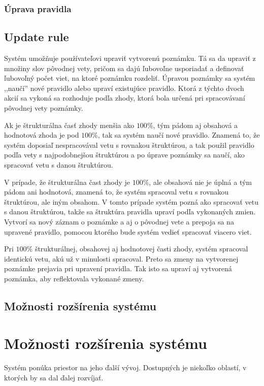 %
%
{
	\subsubsection{Úprava pravidla}
}
{
	\subsection{Update rule}
}
\label{subsubsection:rule_update}
Systém umožňuje používateľovi upraviť vytvorenú poznámku. Tá sa da upraviť z množiny slov pôvodnej vety, pričom sa dajú ľubovoľne usporiadať a definovať ľubovoľný počet viet, na ktoré poznámku rozdeliť. Úpravou poznámky sa systém ,,naučí'' nové pravidlo alebo upraví existujúce pravidlo. Ktorá z týchto dvoch akcií sa vykoná sa rozhoduje podľa zhody, ktorá bola určená pri spracovávaní pôvodnej vety poznámky. 

Ak je štrukturálna časť zhody  menšia ako $100\%$, tým pádom aj obsahová a hodnotová zhoda je pod $100\%$, tak sa systém naučí nové pravidlo. Znamená to, že systém doposiaľ nespracovával vetu s rovnakou štruktúrou, a tak použil pravidlo podľa vety s najpodobnejšou štruktúrou a po úprave poznámky sa naučí, ako spracovať vetu s danou štruktúrou.

V prípade, že štrukturálna čast zhody je $100\%$, ale obsahová nie je úplná a tým pádom ani hodnotová, znamená to, že systém spracoval vetu s rovnakou štruktúrou, ale iným obsahom. V tomto prípade systém pozná ako spracovať vetu s danou štruktúrou, takže sa štruktúra pravidla upraví podľa vykonaných zmien. Vytvorí sa nový záznam o poznámke a aj o pôvodnej vete a prepoja sa na upravené pravidlo, pomocou ktorého bude systém vedieť spracovať viacero viet.

Pri $100\%$ štrukturálnej, obsahovej aj hodnotovej časti zhody, systém spracoval identickú vetu, akú už v minulosti spracoval. Preto sa zmeny na vytvorenej poznámke prejavia pri upravení pravidla. Tak isto sa upraví aj vytvorená poznámka, aby reflektovala vykonané zmeny.

%
%
{
	\subsection{Možnosti rozšírenia systému}
}
{
	\section{Možnosti rozšírenia systému}
}
\label{subsection:system_continue}
Systém ponúka priestor na jeho ďalší vývoj. Dostupných je niekoľko oblastí, v ktorých by sa dal ďalej rozvíjať.

